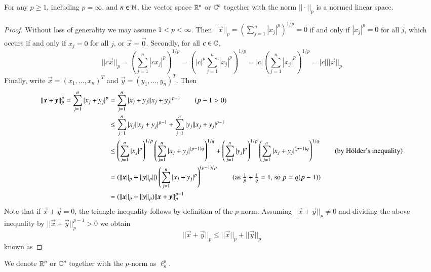 \begin{theorem}
    For any $p \geq 1$, including $p  = \infty$, and $n \in \mathbb N$, the vector space $\mathbb R^n$ or $\mathbb C^n$ together with the norm $||\cdot||_p$ is a normed linear space.
\end{theorem}
\begin{proof}
    Without loss of generality we may assume $1 < p < \infty$. Then $||\vec{x}||_p = \left(\sum_{j=1}^n|x_j|^p\right)^{1/p} = 0$ if and only if $|x_j|^p = 0$ for all $j$, which occurs if and only if $x_j = 0$ for all $j$, or $\vec{x} = \vec{0}$. Secondly, for all $c \in \mathbb C$, $$||c\vec{x}||_p = \left(\sum_{j=1}^n|cx_j|^p\right)^{1/p} = \left(|c|^p\sum_{j=1}^n|x_j|^p\right)^{1/p} = |c|\left(\sum_{j=1}^n|x_j|^p\right)^{1/p} = |c|||\vec{x}||_p$$
    Finally, write $\vec{x} = (x_1,...,x_n)^T$ and $\vec{y} = (y_1,...,y_n)^T$. Then \begin{align*}
        ||\vec{x}+\vec{y}||_p^p = \sum_{j=1}^n|x_j+y_j|^p &= \sum_{j=1}^n|x_j+y_j||x_j+y_j|^{p-1} \tag{$p-1 > 0$} \\
        &\leq \sum_{j=1}^n|x_j||x_j+y_j|^{p-1} + \sum_{j=1}^n|y_j||x_j+y_j|^{p-1} \\
        &\leq \left(\sum_{j=1}^n|x_j|^p\right)^{1/p}\left(\sum_{j=1}^n|x_j+y_j|^{(p-1)q}\right)^{1/q}+\left(\sum_{j=1}^n|y_j|^p\right)^{1/p}\left(\sum_{j=1}^n|x_j+y_j|^{(p-1)q}\right)^{1/q} \tag{by H\"{o}lder's inequality} \\
        &= (||\vec{x}||_p + ||\vec{y}||_p||)\left(\sum_{j=1}^n|x_j+y_j|^p\right)^{(p-1)/p} \tag{as $\frac{1}{p}+\frac{1}{q} = 1$, so $p = q(p-1)$} \\
        &= (||\vec{x}||_p+||\vec{y}||_p)||\vec{x}+\vec{y}||_p^{p-1}
    \end{align*}
    Note that if $\vec{x}+\vec{y} = 0$, the triangle inequality follows by definition of the $p$-norm. Assuming $||\vec{x}+\vec{y}||_p \neq 0$ and dividing the above inequality by $||\vec{x}+\vec{y}||_p^{p-1} > 0$ we obtain $$||\vec{x} + \vec{y}||_p \leq ||\vec{x}||_p + ||\vec{y}||_p$$ known as 
\end{proof}

\begin{definition}
    We denote $\mathbb R^n$ or $\mathbb C^n$ together with the $p$-norm as $\ell_n^p$.
\end{definition}

